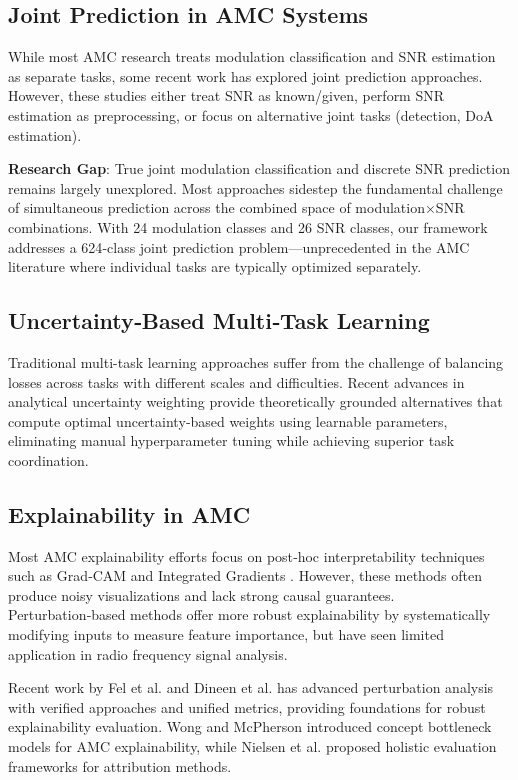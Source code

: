 \documentclass{ELSP}
\begin{document}
\subsection{Joint Prediction in AMC Systems}
While most AMC research treats modulation classification and SNR estimation as separate tasks, some recent work has explored joint prediction approaches. However, these studies either treat SNR as known/given, perform SNR estimation as preprocessing, or focus on alternative joint tasks (detection, DoA estimation).

\textbf{Research Gap}: True joint modulation classification and discrete SNR prediction remains largely unexplored. Most approaches sidestep the fundamental challenge of simultaneous prediction across the combined space of modulation×SNR combinations. With 24 modulation classes and 26 SNR classes, our framework addresses a 624‑class joint prediction problem—unprecedented in the AMC literature where individual tasks are typically optimized separately.

\subsection{Uncertainty‑Based Multi‑Task Learning}
Traditional multi-task learning approaches suffer from the challenge of balancing losses across tasks with different scales and difficulties. Recent advances in analytical uncertainty weighting provide theoretically grounded alternatives that compute optimal uncertainty‑based weights using learnable parameters, eliminating manual hyperparameter tuning while achieving superior task coordination.

\subsection{Explainability in AMC}
Most AMC explainability efforts focus on post‑hoc interpretability techniques such as Grad‑CAM \cite{selvaraju2017grad} and Integrated Gradients \cite{sundararajan2017axiomatic}. However, these methods often produce noisy visualizations and lack strong causal guarantees. Perturbation‑based methods \cite{fong2017interpretable,IVANOVS2021228,robnik2018perturbation} offer more robust explainability by systematically modifying inputs to measure feature importance, but have seen limited application in radio frequency signal analysis.

Recent work by Fel et al. \cite{fel2023don} and Dineen et al. \cite{dineen2024unified} has advanced perturbation analysis with verified approaches and unified metrics, providing foundations for robust explainability evaluation. Wong and McPherson \cite{wong2021explainable} introduced concept bottleneck models for AMC explainability, while Nielsen et al. \cite{nielsen2023evalattai} proposed holistic evaluation frameworks for attribution methods.
\end{document}
